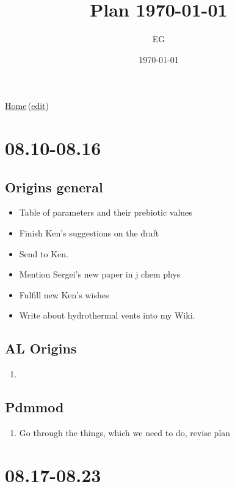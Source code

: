 \documentclass[12pt]{paper}
\title{Plan \today}
\author{EG}
\date{\today}
\newcommand{\wikilink}[2] { \href{#1.pdf}{#2}\,(\href{#1.tex}{edit})}
\begin{document}
 \maketitle
\wikilink{home}{Home}

\tableofcontents


\section{08.10-08.16}
\subsection*{Origins general}
\begin{itemize}
 \item  Table of parameters and their prebiotic values
\item  Finish Ken's suggestions on the draft
\item Send to Ken.
 \item Mention Sergei's new paper in  j chem phys
 \item Fulfill new Ken's wishes
 \item Write about hydrothermal vents into my Wiki.
\end{itemize}



\subsection*{AL Origins}
\begin{enumerate}
 \item 
\end{enumerate}

\subsection*{Pdmmod}
\begin{enumerate}
 \item Go through the things, which we need to do, revise plan
\end{enumerate}


\section{08.17-08.23}
\end{document}
